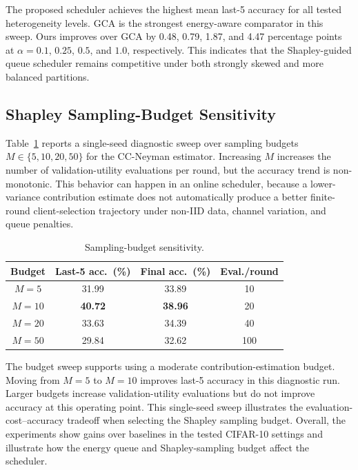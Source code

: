 \documentclass[journal]{IEEEtran}
\begin{document}
The proposed scheduler achieves the highest mean last-5 accuracy for all tested heterogeneity levels. GCA is the strongest energy-aware comparator in this sweep. Ours improves over GCA by 0.48, 0.79, 1.87, and 4.47 percentage points at $\alpha=0.1$, $0.25$, $0.5$, and $1.0$, respectively. This indicates that the Shapley-guided queue scheduler remains competitive under both strongly skewed and more balanced partitions.

\subsection{Shapley Sampling-Budget Sensitivity}

Table~\ref{tab:budget} reports a single-seed diagnostic sweep over sampling budgets $M\in\{5,10,20,50\}$ for the CC-Neyman estimator. Increasing $M$ increases the number of validation-utility evaluations per round, but the accuracy trend is non-monotonic. This behavior can happen in an online scheduler, because a lower-variance contribution estimate does not automatically produce a better finite-round client-selection trajectory under non-IID data, channel variation, and queue penalties.

\begin{table}[!htbp]
\centering
\caption{Sampling-budget sensitivity.}
\label{tab:budget}
\scriptsize
\setlength{\tabcolsep}{2.2pt}
\begin{tabular}{c|c|c|c}
\hline
\textbf{Budget} & \textbf{Last-5 acc.\ (\%)} & \textbf{Final acc.\ (\%)} & \textbf{Eval./round} \\
\hline
$M=5$  & 31.99 & 33.89 & 10 \\
$M=10$ & \textbf{40.72} & \textbf{38.96} & 20 \\
$M=20$ & 33.63 & 34.39 & 40 \\
$M=50$ & 29.84 & 32.62 & 100 \\
\hline
\end{tabular}
\end{table}

The budget sweep supports using a moderate contribution-estimation budget. Moving from $M=5$ to $M=10$ improves last-5 accuracy in this diagnostic run. Larger budgets increase validation-utility evaluations but do not improve accuracy at this operating point. This single-seed sweep illustrates the evaluation-cost--accuracy tradeoff when selecting the Shapley sampling budget. Overall, the experiments show gains over baselines in the tested CIFAR-10 settings and illustrate how the energy queue and Shapley-sampling budget affect the scheduler.
\end{document}
